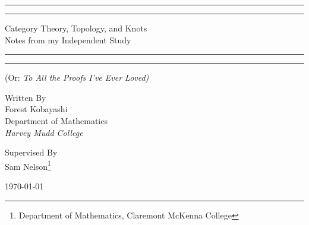 \documentclass{fkbook}
\newcommand{\plogo}{\fbox{$\mathcal{FK}$}} %
\theoremstyle{snazzydefinition}
\begin{document}
\pagestyle{plain}
\frontmatter
\begin{titlepage} %

  \centering\scshape

  \rule{\textwidth}{1pt}\vspace*{-\baselineskip}\vspace*{2pt}
  \rule{\textwidth}{0.4pt}

  \vspace{0.75\baselineskip} %

  {\LARGE Category Theory, Topology, and Knots\\}
  {\Large Notes from my Independent Study\\}

  \vspace{0.75\baselineskip} %

  \rule{\textwidth}{0.4pt}\vspace*{-\baselineskip}\vspace*{2.4pt}
  \rule{\textwidth}{1pt}

  \vspace{\baselineskip} %


  {\large (\normalfont Or: \itshape To All the Proofs I've Ever
    Loved)}

  \vspace*{12\baselineskip}


  {Written By\\}
  {\Large Forest Kobayashi\\} %
  \vspace{2\baselineskip}
  {Department of Mathematics\\}
  {\itshape Harvey Mudd College\\} %

  \vfill %


  {\small Supervised By\\}
  {Sam Nelson\footnote{Department of Mathematics, Claremont McKenna College}\\}
  \vspace{4\baselineskip}

  \plogo %

  \vspace{0.3\baselineskip} %

  {\large \normalfont \today} %


\end{titlepage}
\end{document}
